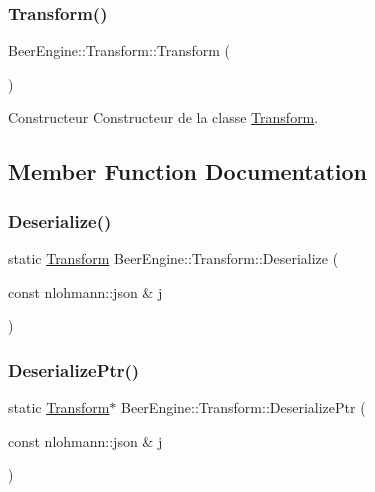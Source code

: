 \subsubsection{\texorpdfstring{Transform()}{Transform()}}
{\footnotesize\ttfamily Beer\+Engine\+::\+Transform\+::\+Transform (\begin{DoxyParamCaption}{ }\end{DoxyParamCaption})}



Constructeur Constructeur de la classe \mbox{\hyperlink{class_beer_engine_1_1_transform}{Transform}}. 



\subsection{Member Function Documentation}
\mbox{\label{class_beer_engine_1_1_transform_a886b373a8708f3ea638925d49c51fff4}} 
\subsubsection{\texorpdfstring{Deserialize()}{Deserialize()}}
{\footnotesize\ttfamily static \mbox{\hyperlink{class_beer_engine_1_1_transform}{Transform}} Beer\+Engine\+::\+Transform\+::\+Deserialize (\begin{DoxyParamCaption}\item[{const nlohmann\+::json \&}]{j }\end{DoxyParamCaption})\hspace{0.3cm}{\ttfamily [static]}}

\mbox{\label{class_beer_engine_1_1_transform_ad3a0ee89fdc0113a71de681ae099dd52}} 
\subsubsection{\texorpdfstring{Deserialize\+Ptr()}{DeserializePtr()}}
{\footnotesize\ttfamily static \mbox{\hyperlink{class_beer_engine_1_1_transform}{Transform}}$\ast$ Beer\+Engine\+::\+Transform\+::\+Deserialize\+Ptr (\begin{DoxyParamCaption}\item[{const nlohmann\+::json \&}]{j }\end{DoxyParamCaption})\hspace{0.3cm}{\ttfamily [static]}}

